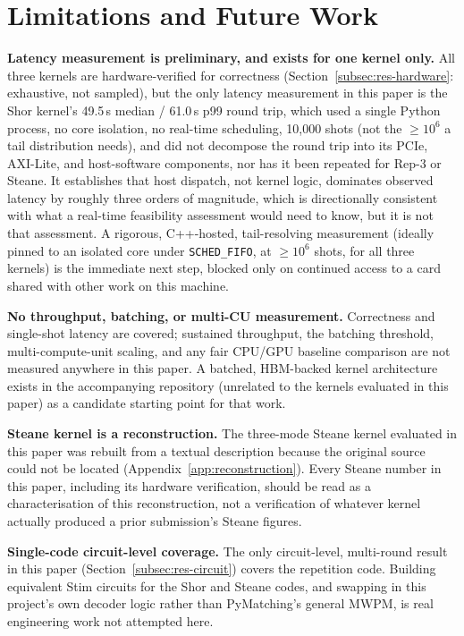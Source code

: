 \section{Limitations and Future Work}\label{sec:limitations}

\textbf{Latency measurement is preliminary, and exists for one kernel only.} All three kernels are hardware-verified for correctness (Section~\ref{subsec:res-hardware}: exhaustive, not sampled), but the only latency measurement in this paper is the Shor kernel's 49.5\,\textmu{}s median / 61.0\,\textmu{}s p99 round trip, which used a single Python process, no core isolation, no real-time scheduling, 10,000 shots (not the \(\ge10^6\) a tail distribution needs), and did not decompose the round trip into its PCIe, AXI-Lite, and host-software components, nor has it been repeated for Rep-3 or Steane. It establishes that host dispatch, not kernel logic, dominates observed latency by roughly three orders of magnitude, which is directionally consistent with what a real-time feasibility assessment would need to know, but it is not that assessment. A rigorous, C++-hosted, tail-resolving measurement (ideally pinned to an isolated core under \texttt{SCHED\_FIFO}, at \(\ge10^6\) shots, for all three kernels) is the immediate next step, blocked only on continued access to a card shared with other work on this machine.

\textbf{No throughput, batching, or multi-CU measurement.} Correctness and single-shot latency are covered; sustained throughput, the batching threshold, multi-compute-unit scaling, and any fair CPU/GPU baseline comparison are not measured anywhere in this paper. A batched, HBM-backed kernel architecture exists in the accompanying repository (unrelated to the kernels evaluated in this paper) as a candidate starting point for that work.

\textbf{Steane kernel is a reconstruction.} The three-mode Steane kernel evaluated in this paper was rebuilt from a textual description because the original source could not be located (Appendix~\ref{app:reconstruction}). Every Steane number in this paper, including its hardware verification, should be read as a characterisation of this reconstruction, not a verification of whatever kernel actually produced a prior submission's Steane figures.

\textbf{Single-code circuit-level coverage.} The only circuit-level, multi-round result in this paper (Section~\ref{subsec:res-circuit}) covers the repetition code. Building equivalent Stim circuits for the Shor and Steane codes, and swapping in this project's own decoder logic rather than PyMatching's general MWPM, is real engineering work not attempted here.

